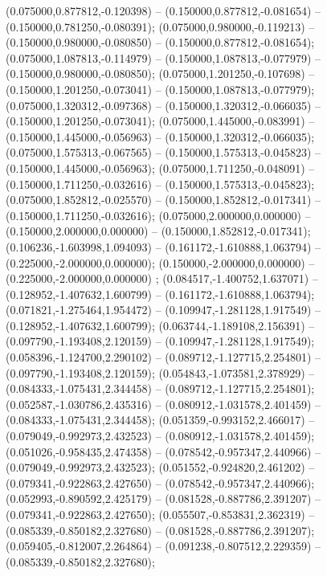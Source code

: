  (0.075000,0.877812,-0.120398) -- (0.150000,0.877812,-0.081654) -- (0.150000,0.781250,-0.080391);
 (0.075000,0.980000,-0.119213) -- (0.150000,0.980000,-0.080850) -- (0.150000,0.877812,-0.081654);
 (0.075000,1.087813,-0.114979) -- (0.150000,1.087813,-0.077979) -- (0.150000,0.980000,-0.080850);
 (0.075000,1.201250,-0.107698) -- (0.150000,1.201250,-0.073041) -- (0.150000,1.087813,-0.077979);
 (0.075000,1.320312,-0.097368) -- (0.150000,1.320312,-0.066035) -- (0.150000,1.201250,-0.073041);
 (0.075000,1.445000,-0.083991) -- (0.150000,1.445000,-0.056963) -- (0.150000,1.320312,-0.066035);
 (0.075000,1.575313,-0.067565) -- (0.150000,1.575313,-0.045823) -- (0.150000,1.445000,-0.056963);
 (0.075000,1.711250,-0.048091) -- (0.150000,1.711250,-0.032616) -- (0.150000,1.575313,-0.045823);
 (0.075000,1.852812,-0.025570) -- (0.150000,1.852812,-0.017341) -- (0.150000,1.711250,-0.032616);
 (0.075000,2.000000,0.000000) -- (0.150000,2.000000,0.000000) -- (0.150000,1.852812,-0.017341);
 (0.106236,-1.603998,1.094093) -- (0.161172,-1.610888,1.063794) -- (0.225000,-2.000000,0.000000);
 (0.150000,-2.000000,0.000000) -- (0.225000,-2.000000,0.000000) ;
 (0.084517,-1.400752,1.637071) -- (0.128952,-1.407632,1.600799) -- (0.161172,-1.610888,1.063794);
 (0.071821,-1.275464,1.954472) -- (0.109947,-1.281128,1.917549) -- (0.128952,-1.407632,1.600799);
 (0.063744,-1.189108,2.156391) -- (0.097790,-1.193408,2.120159) -- (0.109947,-1.281128,1.917549);
 (0.058396,-1.124700,2.290102) -- (0.089712,-1.127715,2.254801) -- (0.097790,-1.193408,2.120159);
 (0.054843,-1.073581,2.378929) -- (0.084333,-1.075431,2.344458) -- (0.089712,-1.127715,2.254801);
 (0.052587,-1.030786,2.435316) -- (0.080912,-1.031578,2.401459) -- (0.084333,-1.075431,2.344458);
 (0.051359,-0.993152,2.466017) -- (0.079049,-0.992973,2.432523) -- (0.080912,-1.031578,2.401459);
 (0.051026,-0.958435,2.474358) -- (0.078542,-0.957347,2.440966) -- (0.079049,-0.992973,2.432523);
 (0.051552,-0.924820,2.461202) -- (0.079341,-0.922863,2.427650) -- (0.078542,-0.957347,2.440966);
 (0.052993,-0.890592,2.425179) -- (0.081528,-0.887786,2.391207) -- (0.079341,-0.922863,2.427650);
 (0.055507,-0.853831,2.362319) -- (0.085339,-0.850182,2.327680) -- (0.081528,-0.887786,2.391207);
 (0.059405,-0.812007,2.264864) -- (0.091238,-0.807512,2.229359) -- (0.085339,-0.850182,2.327680);
